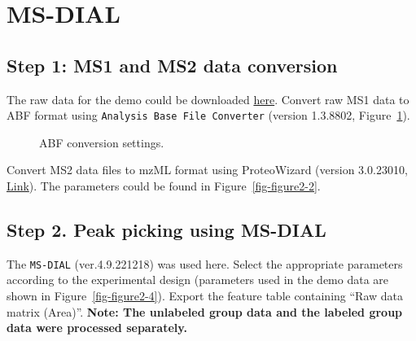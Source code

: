\documentclass[
  letterpaper,
  DIV=11,
  numbers=noendperiod]{scrreprt}
\begin{document}
\section{MS-DIAL}\label{sec-msdial}

\subsection{Step 1: MS1 and MS2 data
conversion}\label{step-1-ms1-and-ms2-data-conversion}

The raw data for the demo could be downloaded
\href{https://github.com/DoddLab/IsoPairFinder_DemoData_DiffTools/tree/main/00_raw_data}{here}.
Convert raw MS1 data to ABF format using
\texttt{Analysis\ Base\ File\ Converter} (version 1.3.8802,
Figure~\ref{fig-figure2-3}).

\begin{figure}


\caption{\label{fig-figure2-3}ABF conversion settings.}

\end{figure}%

Convert MS2 data files to mzML format using ProteoWizard (version
3.0.23010, \href{https://proteowizard.sourceforge.io/}{Link}). The
parameters could be found in Figure~\ref{fig-figure2-2}.

\subsection{Step 2. Peak picking using
MS-DIAL}\label{step-2.-peak-picking-using-ms-dial}

The \texttt{MS-DIAL} (ver.4.9.221218) was used here. Select the
appropriate parameters according to the experimental design (parameters
used in the demo data are shown in Figure~\ref{fig-figure2-4}). Export
the feature table containing ``Raw data matrix (Area)''. \textbf{Note:
The unlabeled group data and the labeled group data were processed
separately.}
\end{document}
